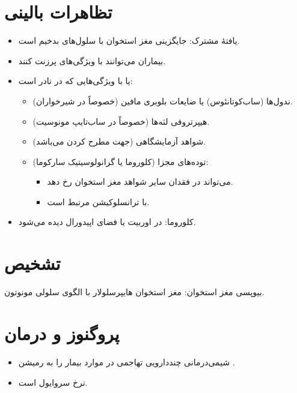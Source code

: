 \documentclass[12pt,a4paper]{article}
\begin{document}
\section*{تظاهرات بالینی}
\begin{itemize}
\item یافتهٔ مشترک: جایگزینی مغز استخوان با سلول‌های بدخیم است.
\item بیماران  می‌توانند با ویژگی‌های  پرزنت کنند.
\item یا با ویژگی‌هایی که در  نادر است:
\begin{itemize}
\item ندول‌ها (ساب‌کوتانئوس) یا ضایعات بلوبری مافین (خصوصاً در شیرخواران).
\item هیپرتروفی لثه‌ها (خصوصاً در ساب‌تایپ مونوسیت).
\item شواهد آزمایشگاهی  (جهت مطرح کردن  می‌باشد).
\item توده‌های مجزا (کلوروما یا گرانولوسیتیک سارکوما):
\begin{itemize}
\item می‌تواند در فقدان سایر شواهد مغز استخوان رخ دهد.
\item با ترانسلوکیشن  مرتبط است.
\end{itemize}
\end{itemize}
\item کلوروما: در اوربیت یا فضای اپیدورال دیده می‌شود.
\end{itemize}
\section*{تشخیص }
بیوپسی مغز استخوان: مغز استخوان هایپرسلولار با الگوی سلولی مونوتون.
\section*{پروگنوز و درمان }
\begin{itemize}
\item شیمی‌درمانی چنددارویی تهاجمی در  موارد بیمار را به رمیشن  .
\item نرخ سروایول  است.
\end{itemize}

\end{document}

